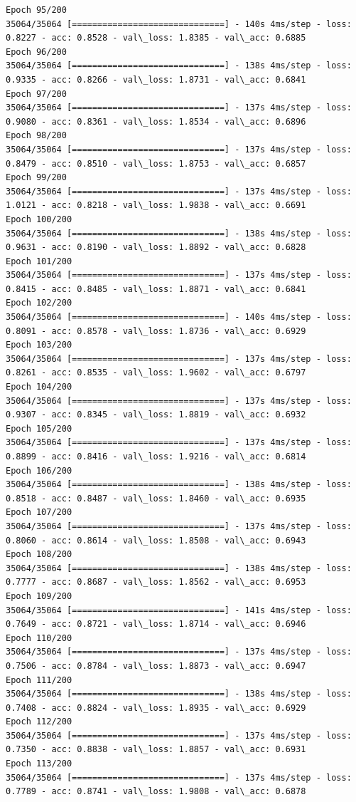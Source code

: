 \documentclass[11pt]{article}
\begin{document}
\begin{Verbatim}[commandchars=\\\{\}]
Epoch 95/200
35064/35064 [==============================] - 140s 4ms/step - loss: 0.8227 - acc: 0.8528 - val\_loss: 1.8385 - val\_acc: 0.6885
Epoch 96/200
35064/35064 [==============================] - 138s 4ms/step - loss: 0.9335 - acc: 0.8266 - val\_loss: 1.8731 - val\_acc: 0.6841
Epoch 97/200
35064/35064 [==============================] - 137s 4ms/step - loss: 0.9080 - acc: 0.8361 - val\_loss: 1.8534 - val\_acc: 0.6896
Epoch 98/200
35064/35064 [==============================] - 137s 4ms/step - loss: 0.8479 - acc: 0.8510 - val\_loss: 1.8753 - val\_acc: 0.6857
Epoch 99/200
35064/35064 [==============================] - 137s 4ms/step - loss: 1.0121 - acc: 0.8218 - val\_loss: 1.9838 - val\_acc: 0.6691
Epoch 100/200
35064/35064 [==============================] - 138s 4ms/step - loss: 0.9631 - acc: 0.8190 - val\_loss: 1.8892 - val\_acc: 0.6828
Epoch 101/200
35064/35064 [==============================] - 137s 4ms/step - loss: 0.8415 - acc: 0.8485 - val\_loss: 1.8871 - val\_acc: 0.6841
Epoch 102/200
35064/35064 [==============================] - 140s 4ms/step - loss: 0.8091 - acc: 0.8578 - val\_loss: 1.8736 - val\_acc: 0.6929
Epoch 103/200
35064/35064 [==============================] - 137s 4ms/step - loss: 0.8261 - acc: 0.8535 - val\_loss: 1.9602 - val\_acc: 0.6797
Epoch 104/200
35064/35064 [==============================] - 137s 4ms/step - loss: 0.9307 - acc: 0.8345 - val\_loss: 1.8819 - val\_acc: 0.6932
Epoch 105/200
35064/35064 [==============================] - 137s 4ms/step - loss: 0.8899 - acc: 0.8416 - val\_loss: 1.9216 - val\_acc: 0.6814
Epoch 106/200
35064/35064 [==============================] - 138s 4ms/step - loss: 0.8518 - acc: 0.8487 - val\_loss: 1.8460 - val\_acc: 0.6935
Epoch 107/200
35064/35064 [==============================] - 137s 4ms/step - loss: 0.8060 - acc: 0.8614 - val\_loss: 1.8508 - val\_acc: 0.6943
Epoch 108/200
35064/35064 [==============================] - 138s 4ms/step - loss: 0.7777 - acc: 0.8687 - val\_loss: 1.8562 - val\_acc: 0.6953
Epoch 109/200
35064/35064 [==============================] - 141s 4ms/step - loss: 0.7649 - acc: 0.8721 - val\_loss: 1.8714 - val\_acc: 0.6946
Epoch 110/200
35064/35064 [==============================] - 137s 4ms/step - loss: 0.7506 - acc: 0.8784 - val\_loss: 1.8873 - val\_acc: 0.6947
Epoch 111/200
35064/35064 [==============================] - 138s 4ms/step - loss: 0.7408 - acc: 0.8824 - val\_loss: 1.8935 - val\_acc: 0.6929
Epoch 112/200
35064/35064 [==============================] - 137s 4ms/step - loss: 0.7350 - acc: 0.8838 - val\_loss: 1.8857 - val\_acc: 0.6931
Epoch 113/200
35064/35064 [==============================] - 137s 4ms/step - loss: 0.7789 - acc: 0.8741 - val\_loss: 1.9808 - val\_acc: 0.6878

\end{Verbatim}
\end{document}
